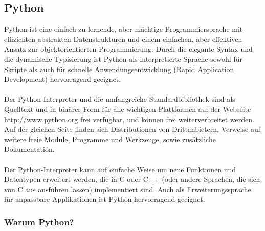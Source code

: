 \subsection{Python}
\noindent
Python ist eine einfach zu lernende, aber mächtige Programmiersprache mit effizienten abstrakten Datenstrukturen und einem einfachen, aber effektiven Ansatz zur objektorientierten Programmierung. Durch die elegante Syntax und die dynamische Typisierung ist Python als interpretierte Sprache sowohl für Skripte als auch für schnelle Anwendungsentwicklung (Rapid Application Development) hervorragend geeignet.\\
\\
Der Python-Interpreter und die umfangreiche Standardbibliothek sind als Quelltext und in binärer Form für alle wichtigen Plattformen auf der Webseite http://www.python.org frei verfügbar, und können frei weiterverbreitet werden. Auf der gleichen Seite finden sich Distributionen von Drittanbietern, Verweise auf weitere freie Module, Programme und Werkzeuge, sowie zusätzliche Dokumentation.\\
\\
Der Python-Interpreter kann auf einfache Weise um neue Funktionen und Datentypen erweitert werden, die in C oder C++ (oder andere Sprachen, die sich von C aus ausführen lassen) implementiert sind. Auch als Erweiterungssprache für anpassbare Applikationen ist Python hervorragend geeignet.

\subsubsection{Warum Python?}

